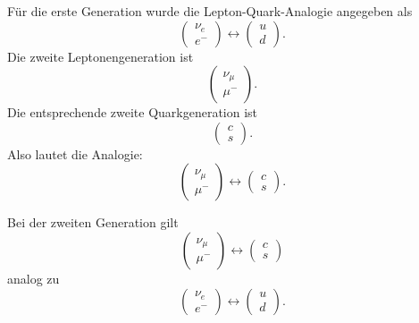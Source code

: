 \documentclass[11pt,a4paper]{scrartcl}
\theoremstyle{definition}
\theoremstyle{plain}
\theoremstyle{remark}
\begin{document}
\begin{enumerate}[label=(\alph*)]
    \begin{calculationbox}
        Für die erste Generation wurde die Lepton-Quark-Analogie angegeben als
        \[
            \begin{pmatrix}
            \nu_e\\ e^-
            \end{pmatrix}
            \leftrightarrow
            \begin{pmatrix}
            u\\ d
            \end{pmatrix}.
        \]
        Die zweite Leptonengeneration ist
        \[
            \begin{pmatrix}
            \nu_\mu\\ \mu^-
            \end{pmatrix}.
        \]
        Die entsprechende zweite Quarkgeneration ist
        \[
            \begin{pmatrix}
            c\\ s
            \end{pmatrix}.
        \]
        Also lautet die Analogie:
        \[
            \begin{pmatrix}
            \nu_\mu\\ \mu^-
            \end{pmatrix}
            \leftrightarrow
            \begin{pmatrix}
            c\\ s
            \end{pmatrix}.
        \]
    \end{calculationbox}

    \begin{answerbox}
        Bei der zweiten Generation gilt
        \[
            \boxed{
            \begin{pmatrix}
            \nu_\mu\\ \mu^-
            \end{pmatrix}
            \leftrightarrow
            \begin{pmatrix}
            c\\ s
            \end{pmatrix}}
        \]
        analog zu
        \[
            \begin{pmatrix}
            \nu_e\\ e^-
            \end{pmatrix}
            \leftrightarrow
            \begin{pmatrix}
            u\\ d
            \end{pmatrix}.
        \]
    \end{answerbox}


\end{enumerate}
\end{document}
